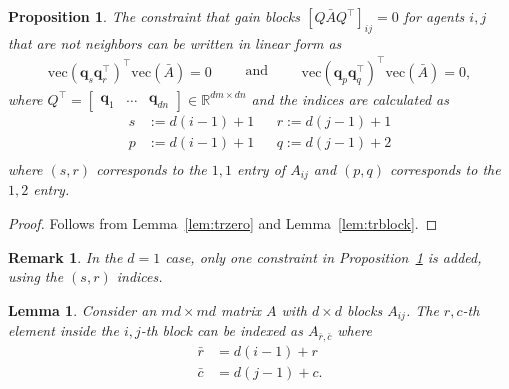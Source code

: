 \documentclass[a4paper]{article}
\newtheorem{prop}{Proposition}
\newtheorem{lem}{Lemma}
\newtheorem{rem}{Remark}
\begin{document}
\begin{prop}\label{prop:graphconstraint-vec}
The constraint that gain blocks $\left[Q\bar{A}Q^\top\right]_{ij} = 0$ for agents $i,j$ that are not neighbors can be written in linear form as
\begin{equation*}
\begin{split}
\mathrm{vec}(\mathbf{q}_s\mathbf{q}^\top_r)^\top \mathrm{vec}(\bar{A}) = 0
\end{split}
\qquad\mathrm{and}\qquad
\begin{split}
\mathrm{vec}(\mathbf{q}_p\mathbf{q}^\top_q)^\top \mathrm{vec}(\bar{A}) = 0,
\end{split}
\end{equation*}
where $Q^\top=\begin{bmatrix}\mathbf{q}_1&\dots&\mathbf{q}_{dn}\end{bmatrix}\in\mathbb{R}^{dm\times dn}$ and the indices are calculated as
\begin{align*}
s &:= d(i-1)+1
&& r := d(j-1)+1 \\
p &:= d(i-1)+1
&& q := d(j-1)+2 \\
\end{align*}
where $(s,r)$ corresponds to the $1,1$ entry of $A_{ij}$ and $(p,q)$ corresponds to the $1,2$ entry.
\end{prop}
\begin{proof}
Follows from Lemma~\ref{lem:trzero} and Lemma~\ref{lem:trblock}.
\end{proof}

\begin{rem}
In the $d=1$ case, only one constraint in Proposition~\ref{prop:graphconstraint-vec} is added, using the $(s,r)$ indices.
\end{rem}

\begin{lem}\label{lem:block-index}
Consider an $md\times md$ matrix $A$ with $d\times d$ blocks $A_{ij}$.
The $r,c$-th element inside the $i,j$-th block can be indexed as $A_{\bar{r},\bar{c}}$ where
\begin{align*}
\bar{r} &= d(i-1) + r \\
\bar{c} &= d(j-1) + c.
\end{align*}
\end{lem}
\end{document}

